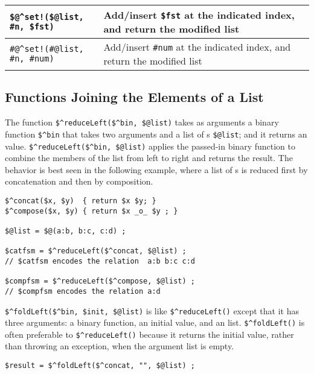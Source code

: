 \vspace{.5cm}

\noindent
\begin{tabular}{|l|p{5.5cm}|}
\hline
\verb+$@^set!($@list, #n, $fst)+ & Add/insert \verb!$fst! at the indicated index, and return the
modified list\\
\hline
\verb+#@^set!(#@list, #n, #num)+ & Add/insert \verb!#num! at the indicated index, and return the
modified list\\
\hline
\end{tabular}

\vspace{.5cm}

\subsection{Functions Joining the Elements of a List}

The function 
\verb!$^reduceLeft($^bin, $@list)! takes as arguments a binary function
\verb!$^bin! that takes two \fsm{} arguments and a list of \fsm{}s
\verb!$@list!; and it returns an \fsm{} value.
\verb!$^reduceLeft($^bin, $@list)!  
applies the passed-in binary function to combine the members of
the list from left to right and returns the result.  The behavior is best
seen in the following example, where a list of \fsm{}s is reduced first
by concatenation and then by composition.

\begin{samepage}
\begin{Verbatim}
$^concat($x, $y)  { return $x $y; }
$^compose($x, $y) { return $x _o_ $y ; }

$@list = $@(a:b, b:c, c:d) ;

$catfsm = $^reduceLeft($^concat, $@list) ;
// $catfsm encodes the relation  a:b b:c c:d

$compfsm = $^reduceLeft($^compose, $@list) ;
// $compfsm encodes the relation a:d
\end{Verbatim}
\end{samepage}

\verb!$^foldLeft($^bin, $init, $@list)! is like \verb!$^reduceLeft()! except that it has
three arguments: a binary function, an initial \fsm{} value, and an \fsm{} list.
\verb!$^foldLeft()! is often preferable to \verb!$^reduceLeft()! because
it returns the initial value, rather than throwing an exception, when
the argument list is empty.

\begin{Verbatim}
$result = $^foldLeft($^concat, "", $@list) ;
\end{Verbatim}

